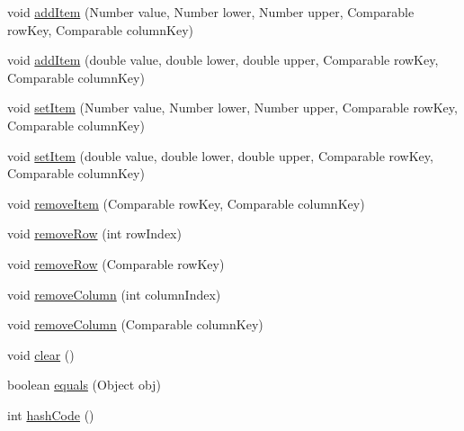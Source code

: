 \begin{DoxyCompactItemize}
void \mbox{\hyperlink{classorg_1_1jfree_1_1data_1_1general_1_1_test_interval_category_dataset_a7504c0fe50b50cb0718d8c2cad4ff01d}{add\+Item}} (Number value, Number lower, Number upper, Comparable row\+Key, Comparable column\+Key)
\item 
void \mbox{\hyperlink{classorg_1_1jfree_1_1data_1_1general_1_1_test_interval_category_dataset_ace081072c20db90d762abd25c178f407}{add\+Item}} (double value, double lower, double upper, Comparable row\+Key, Comparable column\+Key)
\item 
void \mbox{\hyperlink{classorg_1_1jfree_1_1data_1_1general_1_1_test_interval_category_dataset_aa641823ad9ab6f84e2523fa57ce3ad21}{set\+Item}} (Number value, Number lower, Number upper, Comparable row\+Key, Comparable column\+Key)
\item 
void \mbox{\hyperlink{classorg_1_1jfree_1_1data_1_1general_1_1_test_interval_category_dataset_a474dd5d896ad92d126e951b97f076da4}{set\+Item}} (double value, double lower, double upper, Comparable row\+Key, Comparable column\+Key)
\item 
void \mbox{\hyperlink{classorg_1_1jfree_1_1data_1_1general_1_1_test_interval_category_dataset_a5093c08caff886cf2ac4304d291ff2c7}{remove\+Item}} (Comparable row\+Key, Comparable column\+Key)
\item 
void \mbox{\hyperlink{classorg_1_1jfree_1_1data_1_1general_1_1_test_interval_category_dataset_a403f2f5d4fd89770e090526150d10e5a}{remove\+Row}} (int row\+Index)
\item 
void \mbox{\hyperlink{classorg_1_1jfree_1_1data_1_1general_1_1_test_interval_category_dataset_a81dd569d6fc2b5520b35012a5bb392f6}{remove\+Row}} (Comparable row\+Key)
\item 
void \mbox{\hyperlink{classorg_1_1jfree_1_1data_1_1general_1_1_test_interval_category_dataset_af614310dfa6e029f6d910793b7e9e3b4}{remove\+Column}} (int column\+Index)
\item 
void \mbox{\hyperlink{classorg_1_1jfree_1_1data_1_1general_1_1_test_interval_category_dataset_aaac9deaaa8f4e8da7c6b15a0cc31b959}{remove\+Column}} (Comparable column\+Key)
\item 
void \mbox{\hyperlink{classorg_1_1jfree_1_1data_1_1general_1_1_test_interval_category_dataset_ab8af70da258f3fa74c80857f1c07e915}{clear}} ()
\item 
boolean \mbox{\hyperlink{classorg_1_1jfree_1_1data_1_1general_1_1_test_interval_category_dataset_aa1ee2366770bffca5fcb036063c20659}{equals}} (Object obj)
\item 
int \mbox{\hyperlink{classorg_1_1jfree_1_1data_1_1general_1_1_test_interval_category_dataset_a2c9109dd5d936a391aaac0be9f32569a}{hash\+Code}} ()

\end{DoxyCompactItemize}
